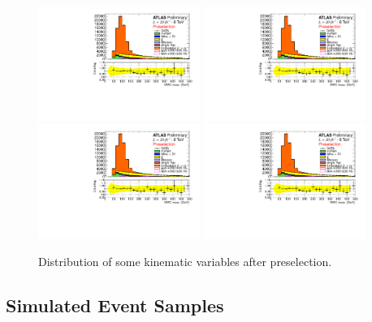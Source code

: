 \begin{figure}[p]
     \begin{center}
            \includegraphics[page=5,width=0.47\textwidth]{figure/std_plots_presel.pdf}
            \includegraphics[page=7,width=0.47\textwidth]{figure/std_plots_presel.pdf}
            \includegraphics[page=2,width=0.47\textwidth]{figure/std_plots_presel.pdf}
            \includegraphics[page=4,width=0.47\textwidth]{figure/std_plots_presel.pdf}

    \end{center}
    \caption{Distribution of some kinematic variables after preselection.}
   \label{fig:validation}
\end{figure}


\subsection{Simulated Event Samples}
\label{sec:SimSamples}

